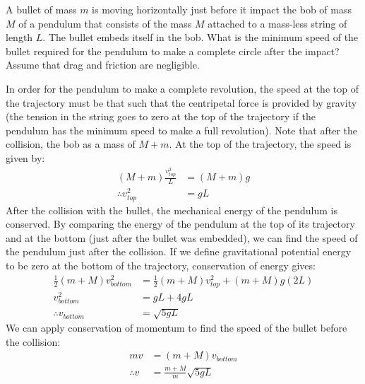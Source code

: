 \question A bullet of mass $m$ is moving horizontally just before it impact the bob of mass $M$ of a pendulum that consists of the mass $M$ attached to a mass-less string of length $L$. The bullet embeds itself in the bob. What is the minimum speed of the bullet required for the pendulum to make a complete circle after the impact? Assume that drag and friction are negligible.
\begin{solution}
In order for the pendulum to make a complete revolution, the speed at the top of the trajectory must be that such that the centripetal force is provided by gravity (the tension in the string goes to zero at the top of the trajectory if the pendulum has the minimum speed to make a full revolution). Note that after the collision, the bob as a mass of $M+m$. At the top of the trajectory, the speed is given by:
\begin{align*}
(M+m)\frac{v^2_{top}}{L}&=(M+m)g\\
\therefore v^2_{top}&=gL
\end{align*}
After the collision with the bullet, the mechanical energy of the pendulum is conserved. By comparing the energy of the pendulum at the top of its trajectory and at the bottom (just after the bullet was embedded), we can find the speed of the pendulum just after the collision. If we define gravitational potential energy to be zero at the bottom of the trajectory, conservation of energy gives:
\begin{align*}
\frac{1}{2}(m+M)v_{bottom}^2&=\frac{1}{2}(m+M)v^2_{top}+(m+M)g(2L)\\
v_{bottom}^2&=gL+4gL\\
\therefore v_{bottom}&=\sqrt{5gL}
\end{align*}
We can apply conservation of momentum to find the speed of the bullet before the collision:
\begin{align*}
mv &= (m+M)v_{bottom}\\
\therefore v &= \frac{m+M}{m}\sqrt{5gL}
\end{align*}
\end{solution}




